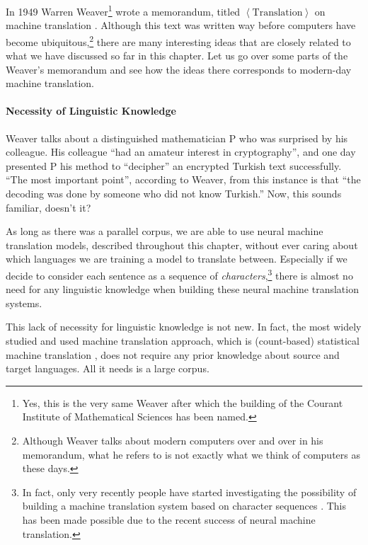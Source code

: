 \documentclass{report}
\begin{document}
In 1949 Warren Weaver\footnote{
    Yes, this is the very same Weaver after which the building of the Courant
    Institute of Mathematical Sciences has been named.
} wrote a memorandum, titled $\left<\text{Translation}\right>$ on machine
translation \citep{weaver1955translation}. Although this text was written way
before computers have become ubiquitous,\footnote{
    Although Weaver talks about modern computers over and over in his
    memorandum, what he refers to is not exactly what we think of computers as
    these days.
} there are many interesting ideas that are closely related to what we have
discussed so far in this chapter. Let us go over some parts of the Weaver's
memorandum and see how the ideas there corresponds to modern-day machine
translation.

\paragraph{Necessity of Linguistic Knowledge}

Weaver talks about a distinguished mathematician P who was surprised by his
colleague. His colleague ``had an amateur interest in cryptography'', and one
day presented P his method to ``decipher'' an encrypted Turkish text
successfully. ``The most important point'', according to Weaver, from this
instance is that ``the decoding was done by someone who did not know Turkish.''
Now, this sounds familiar, doesn't it? 

As long as there was a parallel corpus, we are able to use neural machine
translation models, described throughout this chapter, without ever caring about
which languages we are training a model to translate between.  Especially if we
decide to consider each sentence as a sequence of {\em characters},\footnote{
    In fact, only very recently people have started investigating the
    possibility of building a machine translation system based on character
    sequences \citep{ling2015character}. This has been made possible due to the
    recent success of neural machine translation.
}
there is almost no need for any linguistic knowledge when building these neural
machine translation systems. 

This lack of necessity for linguistic knowledge is not new. In fact, the most
widely studied and used machine translation approach, which is (count-based)
statistical machine translation
\citep{brown1990statistical,koehn2003statistical}, does not require any prior
knowledge about source and target languages. All it needs is a large corpus.
\end{document}
